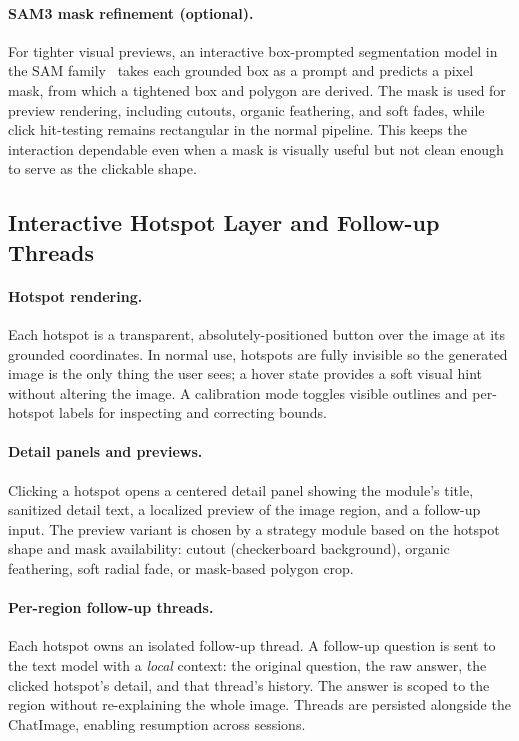 \paragraph{SAM3 mask refinement (optional).}
For tighter visual previews, an interactive box-prompted segmentation model in
the SAM family~\citep{kirillov2023sam,ravi2024sam2} takes each grounded box as
a prompt and predicts a pixel mask, from which a tightened box and polygon are
derived. The mask is used for preview rendering, including cutouts, organic
feathering, and soft fades, while click hit-testing remains rectangular in the normal
pipeline. This keeps the interaction dependable even when a mask is visually
useful but not clean enough to serve as the clickable shape.

\subsection{Interactive Hotspot Layer and Follow-up Threads}
\label{sec:method_interaction}

\paragraph{Hotspot rendering.}
Each hotspot is a transparent, absolutely-positioned button over the image at
its grounded coordinates. In normal use, hotspots are fully invisible so the
generated image is the only thing the user sees; a hover state provides a soft
visual hint without altering the image. A calibration mode toggles visible
outlines and per-hotspot labels for inspecting and correcting bounds.

\paragraph{Detail panels and previews.}
Clicking a hotspot opens a centered detail panel showing the module's title,
sanitized detail text, a localized preview of the image region, and a
follow-up input. The preview variant is chosen by a strategy module based on
the hotspot shape and mask availability: cutout (checkerboard background),
organic feathering, soft radial fade, or mask-based polygon crop.

\paragraph{Per-region follow-up threads.}
Each hotspot owns an isolated follow-up thread. A follow-up question is sent
to the text model with a \emph{local} context: the original question, the raw
answer, the clicked hotspot's detail, and that thread's history. The
answer is scoped to the region without re-explaining the whole image. Threads
are persisted alongside the ChatImage, enabling resumption across sessions.

